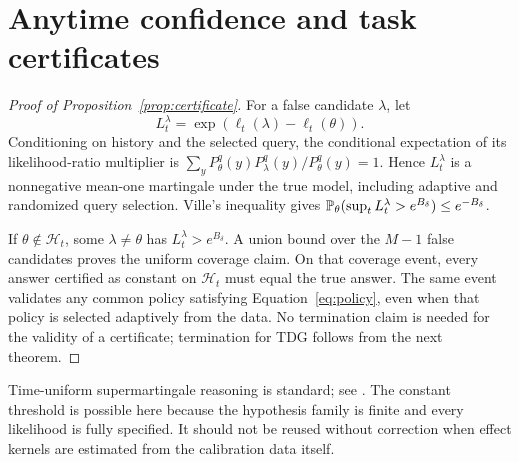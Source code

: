 \section{Anytime confidence and task certificates}\label{app:certificate}
\begin{proof}[Proof of Proposition~\ref{prop:certificate}]
For a false candidate $\lambda$, let
\begin{equation}
L_t^\lambda=\exp(\ell_t(\lambda)-\ell_t(\theta)).
\end{equation}
Conditioning on history and the selected query, the conditional expectation of its likelihood-ratio multiplier is
$\sum_yP_\theta^q(y)P_\lambda^q(y)/P_\theta^q(y)=1$. Hence $L_t^\lambda$ is a nonnegative mean-one martingale under the true model, including adaptive and randomized query selection. Ville's inequality gives
$\mathbb P_\theta(\sup_tL_t^\lambda>e^{B_\delta})\le e^{-B_\delta}$.

If $\theta\notin\mathcal H_t$, some $\lambda\ne\theta$ has $L_t^\lambda>e^{B_\delta}$. A union bound over the $M-1$ false candidates proves the uniform coverage claim. On that coverage event, every answer certified as constant on $\mathcal H_t$ must equal the true answer. The same event validates any common policy satisfying Equation~\eqref{eq:policy}, even when that policy is selected adaptively from the data. No termination claim is needed for the validity of a certificate; termination for TDG follows from the next theorem.
\end{proof}
Time-uniform supermartingale reasoning is standard; see \citet{howard2018}. The constant threshold is possible here because the hypothesis family is finite and every likelihood is fully specified. It should not be reused without correction when effect kernels are estimated from the calibration data itself.

